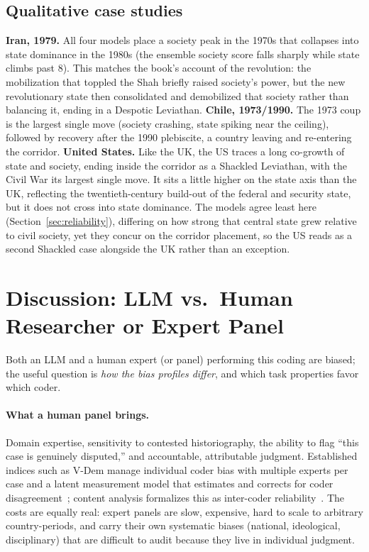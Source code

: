 \documentclass[twocolumn,10pt]{article}
\begin{document}
\subsection{Qualitative case studies}
\textbf{Iran, 1979.} All four models place a society peak in the 1970s that
collapses into state dominance in the 1980s (the ensemble society score falls
sharply while state climbs past 8). This matches the book's account of the
revolution: the mobilization that toppled the Shah briefly raised society's
power, but the new revolutionary state then consolidated and demobilized that
society rather than balancing it, ending in a Despotic Leviathan. \textbf{Chile,
1973/1990.} The 1973 coup is the largest single move (society crashing, state
spiking near the ceiling), followed by recovery after the 1990 plebiscite, a
country leaving and re-entering the corridor. \textbf{United States.} Like the UK, the US traces a long co-growth of state and
society, ending inside the corridor as a Shackled Leviathan, with the Civil War
its largest single move. It sits a little higher on the state axis than the UK,
reflecting the twentieth-century build-out of the federal and security state, but
it does not cross into state dominance. The models agree least here
(Section~\ref{sec:reliability}), differing on how strong that central state grew
relative to civil society, yet they concur on the corridor placement, so the US
reads as a second Shackled case alongside the UK rather than an exception.

\section{Discussion: LLM vs.\ Human Researcher or Expert Panel}
\label{sec:discussion}

Both an LLM and a human expert (or panel) performing this coding are biased; the
useful question is \emph{how the bias profiles differ}, and which task
properties favor which coder.

\paragraph{What a human panel brings.} Domain expertise, sensitivity to
contested historiography, the ability to flag ``this case is genuinely
disputed,'' and accountable, attributable judgment. Established indices such as
V-Dem manage individual coder bias with multiple experts per case and a latent
measurement model that estimates and corrects for coder
disagreement~\citep{pemstein2018vdem}; content analysis formalizes this as
inter-coder reliability~\citep{krippendorff2018content}. The costs are equally
real: expert panels are slow, expensive, hard to scale to arbitrary
country-periods, and carry their own systematic biases (national, ideological,
disciplinary) that are difficult to audit because they live in individual
judgment.
\end{document}
